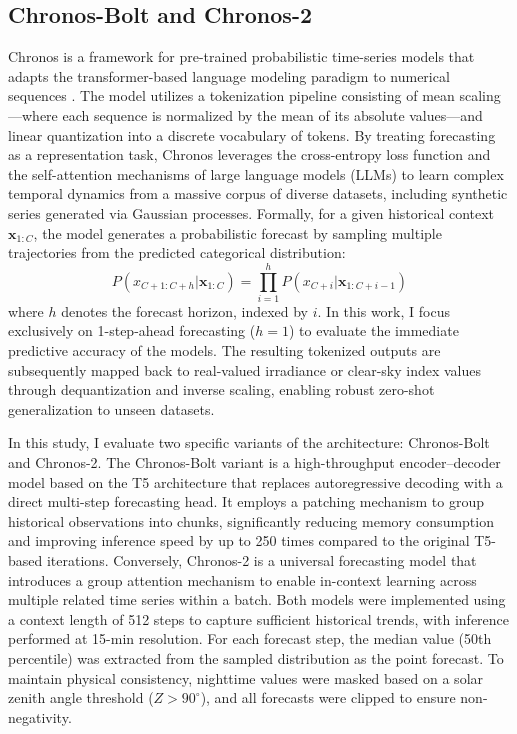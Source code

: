 \documentclass[number, 3p, 10pt, times]{elsarticle}
\begin{document}
\subsection{Chronos-Bolt and Chronos-2}
Chronos is a framework for pre-trained probabilistic time-series models that adapts the transformer-based language modeling paradigm to numerical sequences \citep{Ansari2024}. The model utilizes a tokenization pipeline consisting of mean scaling---where each sequence is normalized by the mean of its absolute values---and linear quantization into a discrete vocabulary of tokens. By treating forecasting as a representation task, Chronos leverages the cross-entropy loss function and the self-attention mechanisms of large language models (LLMs) to learn complex temporal dynamics from a massive corpus of diverse datasets, including synthetic series generated via Gaussian processes. Formally, for a given historical context $\mathbf{x}_{1:C}$, the model generates a probabilistic forecast by sampling multiple trajectories from the predicted categorical distribution:
\begin{equation}
    P(x_{C+1:C+h} | \mathbf{x}_{1:C}) = \prod_{i=1}^{h} P(x_{C+i} | \mathbf{x}_{1:C+i-1})
\end{equation}
where $h$ denotes the forecast horizon, indexed by $i$. In this work, I focus exclusively on 1-step-ahead forecasting ($h=1$) to evaluate the immediate predictive accuracy of the models. The resulting tokenized outputs are subsequently mapped back to real-valued irradiance or clear-sky index values through dequantization and inverse scaling, enabling robust zero-shot generalization to unseen datasets.

In this study, I evaluate two specific variants of the architecture: Chronos-Bolt and Chronos-2. The Chronos-Bolt variant is a high-throughput encoder--decoder model based on the T5 architecture that replaces autoregressive decoding with a direct multi-step forecasting head. It employs a patching mechanism to group historical observations into chunks, significantly reducing memory consumption and improving inference speed by up to 250 times compared to the original T5-based iterations. Conversely, Chronos-2 is a universal forecasting model that introduces a group attention mechanism to enable in-context learning across multiple related time series within a batch. Both models were implemented using a context length of 512 steps to capture sufficient historical trends, with inference performed at 15-min resolution. For each forecast step, the median value (50th percentile) was extracted from the sampled distribution as the point forecast. To maintain physical consistency, nighttime values were masked based on a solar zenith angle threshold ($Z > 90^\circ$), and all forecasts were clipped to ensure non-negativity.
\end{document}
